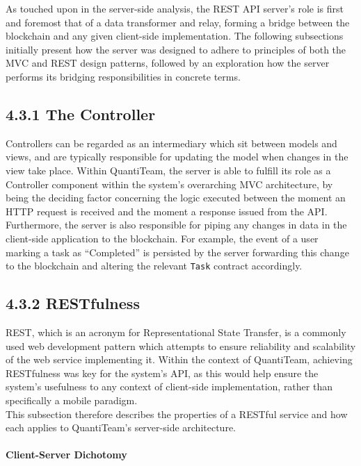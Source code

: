 As touched upon in the server-side analysis, the REST API server's role
is first and foremost that of a data transformer and relay, forming a
bridge between the blockchain and any given client-side implementation.
The following subsections initially present how the server was designed
to adhere to principles of both the MVC and REST design patterns,
followed by an exploration how the server performs its bridging
responsibilities in concrete terms.

\subsection{4.3.1 The Controller}\label{the-controller}

Controllers can be regarded as an intermediary which sit between models
and views, and are typically responsible for updating the model when
changes in the view take
place\cite{osmani2012learning}. Within QuantiTeam, the server is able to fulfill
its role as a Controller component within the system's overarching MVC
architecture, by being the deciding factor concerning the logic executed
between the moment an HTTP request is received and the moment a response
issued from the API. Furthermore, the server is also responsible for
piping any changes in data in the client-side application to the
blockchain. For example, the event of a user marking a task as
``Completed'' is persisted by the server forwarding this change to the
blockchain and altering the relevant \texttt{Task} contract accordingly.

\subsection{4.3.2 RESTfulness}\label{restfulness}

REST, which is an acronym for Representational State Transfer, is a
commonly used web development pattern which attempts to ensure
reliability and scalability of the web service implementing
it\cite{1rest}. Within
the context of QuantiTeam, achieving RESTfulness was key for the
system's API, as this would help ensure the system's usefulness to any
context of client-side implementation, rather than specifically a mobile
paradigm.\\
This subsection therefore describes the properties of a RESTful service
and how each applies to QuantiTeam's server-side architecture.

\paragraph{Client-Server Dichotomy}\label{client-server-dichotomy}

